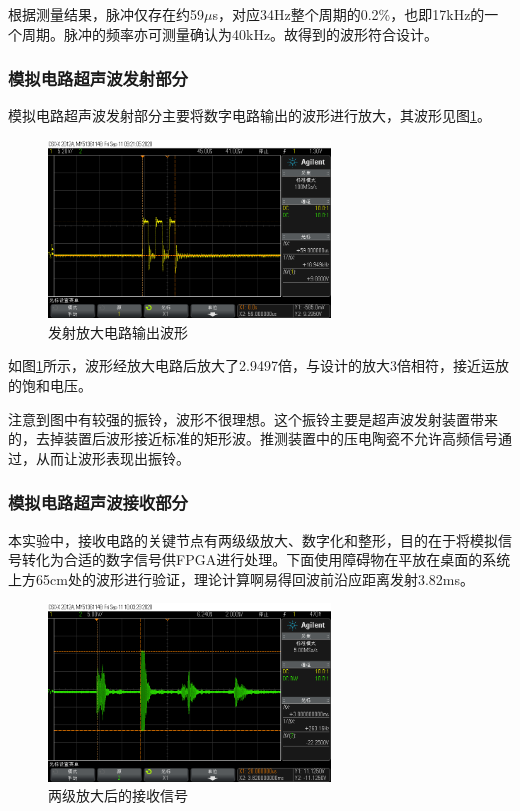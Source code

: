 \documentclass[a4paper, twocolumn]{ctexart}
\begin{document}
根据测量结果，脉冲仅存在约59$\mu$s，对应34Hz整个周期的0.2\%，也即17kHz的一个周期。脉冲的频率亦可测量确认为40kHz。故得到的波形符合设计。

\subsubsection{模拟电路超声波发射部分}

模拟电路超声波发射部分主要将数字电路输出的波形进行放大，其波形见图\ref{fig:tran_amp}。

\begin{figure}[ht]
    \centering
    \includegraphics[width=7.5cm]{../assets/trans_1.png}
    \caption{发射放大电路输出波形}
    \label{fig:tran_amp}
\end{figure}

如图\ref{fig:tran_amp}所示，波形经放大电路后放大了2.9497倍，与设计的放大3倍相符，接近运放的饱和电压。

注意到图中有较强的振铃，波形不很理想。这个振铃主要是超声波发射装置带来的，去掉装置后波形接近标准的矩形波。推测装置中的压电陶瓷不允许高频信号通过，从而让波形表现出振铃。

\subsubsection{模拟电路超声波接收部分}

本实验中，接收电路的关键节点有两级级放大、数字化和整形，目的在于将模拟信号转化为合适的数字信号供FPGA进行处理。下面使用障碍物在平放在桌面的系统上方65cm处的波形进行验证，理论计算啊易得回波前沿应距离发射3.82ms。

\begin{figure}[ht]
    \centering
    \includegraphics[width=7.5cm]{../assets/recv10k_65.png}
    \caption{两级放大后的接收信号}
    \label{fig:rec_10k_amp}
\end{figure}
\end{document}
